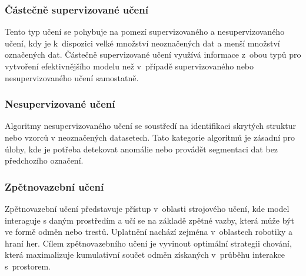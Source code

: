 \subsubsection{Částečně supervizované učení}
Tento typ učení se pohybuje na pomezí supervizovaného a nesupervizovaného učení, kdy je k~dispozici velké množství neoznačených dat a menší množství označených dat. Částečně supervizované učení využívá informace z~obou typů pro vytvoření efektivnějšího modelu než v~případě supervizovaného nebo nesupervizovaného učení samostatně.\cite{burkov2019}

\subsubsection{Nesupervizované učení}
Algoritmy nesupervizovaného učení se soustředí na identifikaci skrytých struktur nebo vzorců v neoznačených datasetech. Tato kategorie algoritmů je zásadní pro úlohy, kde je potřeba detekovat anomálie nebo provádět segmentaci dat bez předchozího označení.\cite{elnaqa2015machine}

\subsubsection{Zpětnovazební učení}
Zpětnovazební učení představuje přístup v~oblasti strojového učení, kde model interaguje s daným prostředím a učí se na základě zpětné vazby, která může být ve formě odměn nebo trestů. Uplatnění nachází zejména v~oblastech robotiky a hraní her. Cílem zpětnovazebního učení je vyvinout optimální strategii chování, která maximalizuje kumulativní součet odměn získaných v~průběhu interakce s~prostorem.
\cite{bishop2006pattern}
